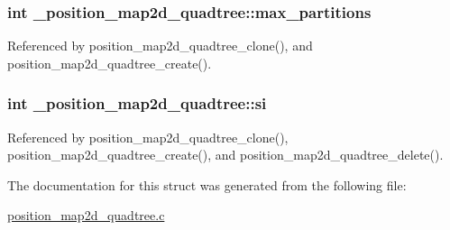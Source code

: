 \subsubsection[{\texorpdfstring{max\+\_\+partitions}{max_partitions}}]{\setlength{\rightskip}{0pt plus 5cm}int \+\_\+position\+\_\+map2d\+\_\+quadtree\+::max\+\_\+partitions}\hypertarget{struct__position__map2d__quadtree_a436c7b1585547aaf5240ad3dfc3837ed}{}\label{struct__position__map2d__quadtree_a436c7b1585547aaf5240ad3dfc3837ed}


Referenced by position\+\_\+map2d\+\_\+quadtree\+\_\+clone(), and position\+\_\+map2d\+\_\+quadtree\+\_\+create().

\subsubsection[{\texorpdfstring{si}{si}}]{\setlength{\rightskip}{0pt plus 5cm}int \+\_\+position\+\_\+map2d\+\_\+quadtree\+::si}\hypertarget{struct__position__map2d__quadtree_a52e7c06e1de56215943c9294d5ed4a1b}{}\label{struct__position__map2d__quadtree_a52e7c06e1de56215943c9294d5ed4a1b}


Referenced by position\+\_\+map2d\+\_\+quadtree\+\_\+clone(), position\+\_\+map2d\+\_\+quadtree\+\_\+create(), and position\+\_\+map2d\+\_\+quadtree\+\_\+delete().



The documentation for this struct was generated from the following file\+:\begin{DoxyCompactItemize}
\item 
\hyperlink{position__map2d__quadtree_8c}{position\+\_\+map2d\+\_\+quadtree.\+c}\end{DoxyCompactItemize}
